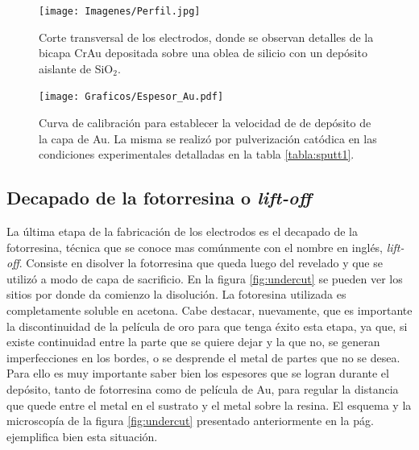 {		 		%
						  \begin{figure}[h!]
						  \begin{center}
						  \texttt{[image: Imagenes/Perfil.jpg]}
						  \caption[Sección trasversal de los eletrodos]{Corte transversal de los electrodos, donde se observan detalles de la bicapa Cr\textbar Au depositada sobre una oblea de silicio con un depósito aislante de SiO$_2$.}
						  \label{fig:FIB_electrodos}
						  \end{center}
						  \end{figure} 	

					   		\begin{figure}[h!]
					   		\begin{center}
							\texttt{[image: Graficos/Espesor\_Au.pdf]}
							\caption[Curva de calibración para el espesor de los electrodos]{Curva de calibración para establecer la velocidad de de depósito de la capa de Au. La misma se realizó por pulverización catódica en las condiciones experimentales detalladas en la tabla \ref{tabla:sputt1}.}
							\label{fig:calibracionAu}
							\end{center}
							\end{figure}		  
		
  		\subsection{Decapado de la fotorresina o\textit{ lift-off}}

		 La última etapa de la fabricación de los electrodos es el decapado de la fotorresina, técnica que se conoce mas comúnmente con el nombre en inglés, \textit{lift-off}. Consiste en disolver la fotorresina que queda luego del revelado y que se utilizó a modo de capa de sacrificio. En la figura \ref{fig:undercut} se pueden ver los sitios por donde da comienzo la disolución. La fotoresina utilizada es completamente soluble en acetona. Cabe destacar, nuevamente, que es importante la discontinuidad de la película de oro para que tenga éxito esta etapa, ya que, si existe continuidad entre la parte que se quiere dejar y la que no, se generan imperfecciones en los bordes, o se desprende el metal de partes que no se desea. Para ello es muy importante saber bien los espesores que se logran durante el depósito, tanto de fotorresina como de película de Au, para regular la distancia que quede entre el metal en el sustrato y el metal sobre la resina. El esquema y la microscopía de la figura \ref{fig:undercut} presentado anteriormente en la pág. \pageref{fig:undercut} ejemplifica bien esta situación.

}
